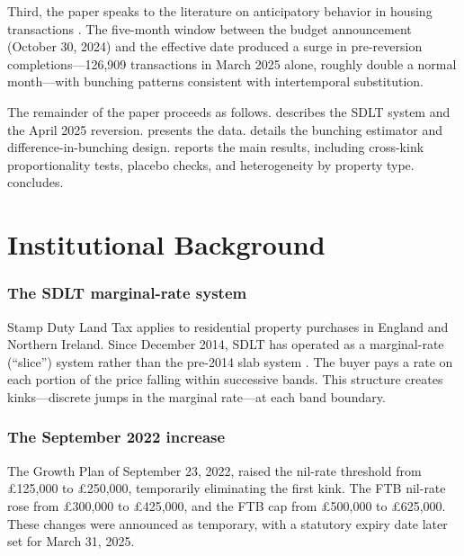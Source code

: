 \documentclass[12pt]{article}
\begin{document}
Third, the paper speaks to the literature on anticipatory behavior in housing transactions \citep{mian2012fiscal, best2018housing}. The five-month window between the budget announcement (October 30, 2024) and the effective date produced a surge in pre-reversion completions---126,909 transactions in March 2025 alone, roughly double a normal month---with bunching patterns consistent with intertemporal substitution.

The remainder of the paper proceeds as follows.  describes the SDLT system and the April 2025 reversion.  presents the data.  details the bunching estimator and difference-in-bunching design.  reports the main results, including cross-kink proportionality tests, placebo checks, and heterogeneity by property type.  concludes.


\section{Institutional Background}\label{sec:background}

\subsubsection*{The SDLT marginal-rate system} Stamp Duty Land Tax applies to residential property purchases in England and Northern Ireland. Since December 2014, SDLT has operated as a marginal-rate (``slice'') system rather than the pre-2014 slab system \citep{best2018housing}. The buyer pays a rate on each portion of the price falling within successive bands. This structure creates kinks---discrete jumps in the marginal rate---at each band boundary.

\subsubsection*{The September 2022 increase} The Growth Plan of September 23, 2022, raised the nil-rate threshold from \pounds 125,000 to \pounds 250,000, temporarily eliminating the first kink. The FTB nil-rate rose from \pounds 300,000 to \pounds 425,000, and the FTB cap from \pounds 500,000 to \pounds 625,000. These changes were announced as temporary, with a statutory expiry date later set for March 31, 2025.
\end{document}

